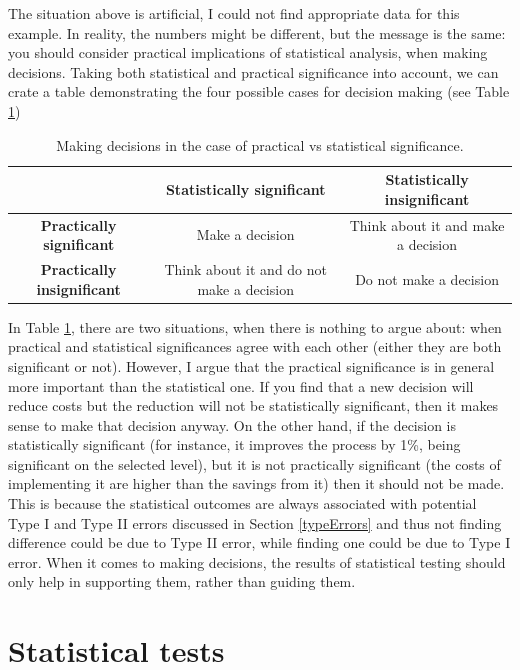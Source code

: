 \documentclass[
]{book}
\theoremstyle{definition}
\theoremstyle{definition}
\theoremstyle{definition}
\theoremstyle{definition}
\theoremstyle{remark}
\begin{document}
The situation above is artificial, I could not find appropriate data for this example. In reality, the numbers might be different, but the message is the same: you should consider practical implications of statistical analysis, when making decisions. Taking both statistical and practical significance into account, we can crate a table demonstrating the four possible cases for decision making (see Table \ref{tab:significanceTable})

\begin{table}

\caption{\label{tab:significanceTable}Making decisions in the case of practical vs statistical significance.}
\centering
\fontsize{12}{14}\selectfont
\begin{tabular}[t]{>{}c|c|c}
\hline
 & Statistically significant & Statistically insignificant\\
\hline
\textbf{Practically significant} & Make a decision & Think about it and make a decision\\
\hline
\textbf{Practically insignificant} & Think about it and do not make a decision & Do not make a decision\\
\hline
\end{tabular}
\end{table}

In Table \ref{tab:significanceTable}, there are two situations, when there is nothing to argue about: when practical and statistical significances agree with each other (either they are both significant or not). However, I argue that the practical significance is in general more important than the statistical one. If you find that a new decision will reduce costs but the reduction will not be statistically significant, then it makes sense to make that decision anyway. On the other hand, if the decision is statistically significant (for instance, it improves the process by 1\%, being significant on the selected level), but it is not practically significant (the costs of implementing it are higher than the savings from it) then it should not be made. This is because the statistical outcomes are always associated with potential Type I and Type II errors discussed in Section \ref{typeErrors} and thus not finding difference could be due to Type II error, while finding one could be due to Type I error. When it comes to making decisions, the results of statistical testing should only help in supporting them, rather than guiding them.

\chapter{Statistical tests}\label{statisticalTests}
\end{document}
